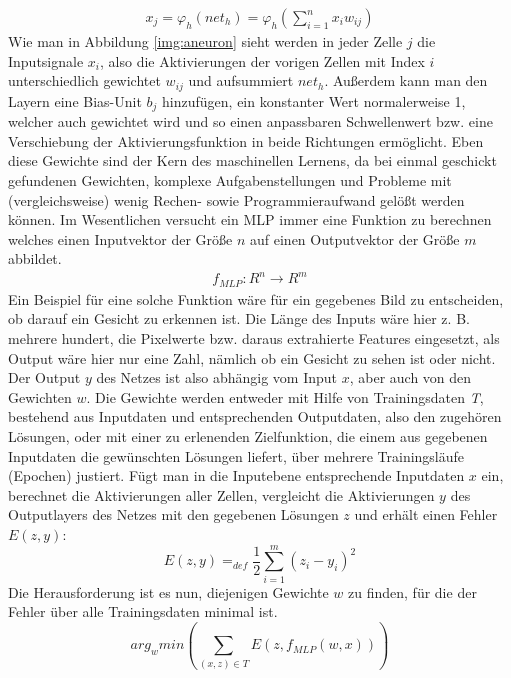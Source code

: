\begin{gather}
x_{j} = \varphi_{h}(net_{h}) = \varphi_{h}(\sum_{i=1}^{n} x_{i}w_{ij}) 
\label{eq:act}
\end{gather}
Wie man in Abbildung \ref{img:aneuron} sieht werden in jeder Zelle \(j\) die Inputsignale \(x_{i}\), also die Aktivierungen der vorigen Zellen mit Index \(i\) unterschiedlich gewichtet \(w_{ij}\)  und aufsummiert \(net_{h}\). Außerdem kann man den Layern eine Bias-Unit $ b_{j} $ hinzufügen, ein konstanter Wert normalerweise 1, welcher auch gewichtet wird und so einen anpassbaren Schwellenwert bzw. eine Verschiebung der Aktivierungsfunktion in beide Richtungen ermöglicht. Eben diese Gewichte sind der Kern des maschinellen Lernens, da bei einmal geschickt gefundenen Gewichten, komplexe Aufgabenstellungen und Probleme mit (vergleichsweise) wenig Rechen- sowie Programmieraufwand gelößt werden können. Im Wesentlichen versucht ein MLP immer eine Funktion zu berechnen welches einen Inputvektor der Größe \(n\) auf einen Outputvektor der Größe \(m\) abbildet.
\begin{gather*}
f_{MLP}: R^n \to R^m 
\end{gather*}
Ein Beispiel für eine solche Funktion wäre für ein gegebenes Bild zu entscheiden, ob darauf ein Gesicht zu erkennen ist. Die Länge des Inputs wäre hier z. B. mehrere hundert, die Pixelwerte bzw. daraus extrahierte Features eingesetzt, als Output wäre hier nur eine Zahl, nämlich ob ein Gesicht zu sehen ist oder nicht. Der Output \(y\) des Netzes ist also abhängig vom Input \(x\), aber auch von den Gewichten \(w\).
Die Gewichte werden entweder mit Hilfe von Trainingsdaten \textit{T}, bestehend aus Inputdaten und entsprechenden Outputdaten, also den zugehören Lösungen, oder mit einer zu erlenenden Zielfunktion, die einem aus gegebenen Inputdaten die gewünschten Lösungen liefert, über mehrere Trainingsläufe (Epochen) justiert. Fügt man in die Inputebene entsprechende Inputdaten \(x\) ein, berechnet die Aktivierungen aller Zellen, vergleicht die Aktivierungen \(y\) des Outputlayers des Netzes mit den gegebenen Lösungen \(z\) und erhält einen Fehler \( E(z,y)\): 
\begin{equation}
E(z,y) =_{def} \dfrac{1}{2} \sum_{i=1}^{m}(z_{i}-y_{i})^{2}	
\end{equation}
Die Herausforderung ist es nun, diejenigen Gewichte \(w\) zu finden, für die der Fehler über alle Trainingsdaten minimal ist.
\begin{equation}
arg_{w} min( \sum_{(x,z)\in T} E(z,f_{MLP}(w,x)))
\end{equation}

